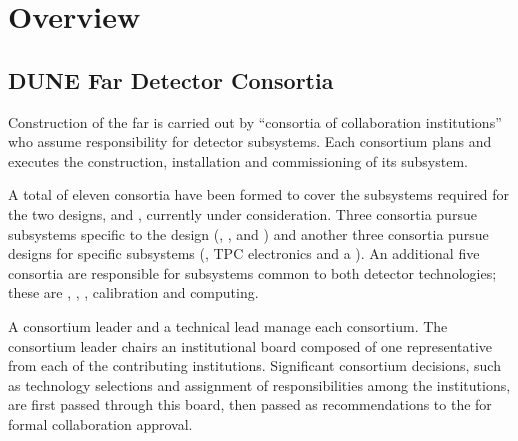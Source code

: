 \chapter{Overview}
\label{vl:tc-overview}





\section{DUNE Far Detector Consortia}
\label{sec:consortia}


Construction of the  far  is carried out by
``consortia of collaboration institutions'' who assume responsibility
for detector subsystems.  Each consortium plans and
executes the construction, installation and commissioning of its 
subsystem.

A total
of eleven  consortia have been formed to cover the
subsystems required for the two  designs,  and , currently under
consideration.  Three  consortia pursue subsystems specific to
the  design (, , and ) and another three consortia pursue designs for 
specific subsystems (, TPC electronics and a  ).  An additional five consortia are responsible for subsystems common to both detector
technologies; these are , , , calibration and computing.



A consortium leader
and a technical lead manage each consortium.  The consortium leader chairs an institutional
board composed of one representative from each of the contributing 
institutions.  Significant 
consortium decisions, such as technology selections and assignment of
responsibilities among the institutions, are first passed
through this board,  then passed as
recommendations to the   for formal collaboration approval. 


